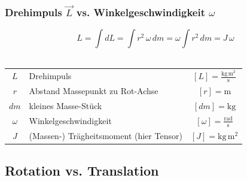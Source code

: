 	
	
	\vfill\null
	\columnbreak
	
	
	\subsubsection{Drehimpuls $\vec{L}$ vs. Winkelgeschwindigkeit $\omega$}
	
	
	$$ \boxed{ L = \int dL = \int r^2 \, \omega \, dm = \omega \int r^2 \, dm = J \, \omega }$$ \\
	
	\begin{tabular}{c l c}
	$L$ & Drehimpuls & $[L] = \mathrm{\frac{kg \, m^2}{s}}$ \\
	$r$ & Abstand Massepunkt zu Rot-Achse & $[r] = \mathrm{m}$ \\
	$dm$ & kleines Masse-Stück & $[dm] = \mathrm{kg}$ \\
	$\omega$ & Winkelgeschwindigkeit & $[\omega] = \mathrm{\frac{rad}{s}}$ \\
	$J$ & (Massen-) Trägheitsmoment (hier Tensor) & $[J] = \mathrm{kg \, m^2}$ \\	
	\end{tabular}
	
	
	\vfill\null
	\columnbreak


	\subsection{Rotation vs. Translation}
	
